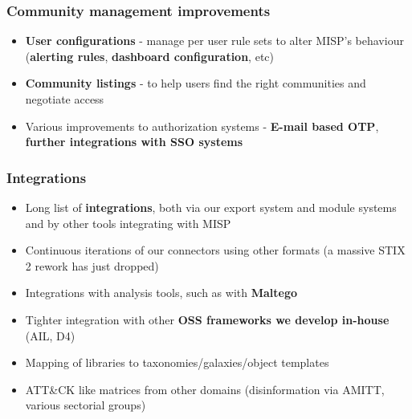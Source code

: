 \begin{frame}
\frametitle{Community management improvements}
\begin{itemize}
	\item {\bf User configurations} - manage per user rule sets to alter MISP's behaviour ({\bf alerting rules}, {\bf dashboard configuration}, etc)
        \item {\bf Community listings} - to help users find the right communities and negotiate access
        \item Various improvements to authorization systems - {\bf E-mail based OTP}, {\bf further integrations with SSO systems}
\end{itemize}
\end{frame}

\begin{frame}
\frametitle{Integrations}
\begin{itemize}
	\item Long list of {\bf integrations}, both via our export system and module systems and by other tools integrating with MISP
        \item Continuous iterations of our connectors using other formats (a massive STIX 2 rework has just dropped)
        \item Integrations with analysis tools, such as with {\bf Maltego}
        \item Tighter integration with other {\bf OSS frameworks we develop in-house} (AIL, D4)
        \item Mapping of libraries to taxonomies/galaxies/object templates
        \item ATT\&CK like matrices from other domains (disinformation via AMITT, various sectorial groups)
\end{itemize}
\end{frame}

